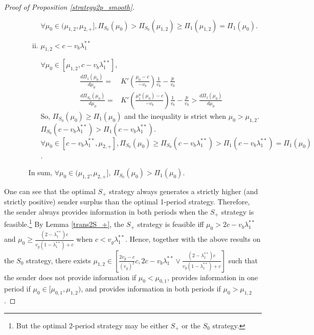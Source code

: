 \documentclass[11pt]{extarticle}
\newcommand{\M}{\vee}
\begin{document}
\begin{proof}[Proof of Proposition \ref{strategy2p_smooth}]
\begin{enumerate}
\begin{enumerate}
\begin{enumerate}[i)]
				$\forall \mu_0 \in (\mu_{1,2}, \mu_{2,+}], \Pi_{S_0}(\mu_0) > \Pi_{S_0}(\mu_{1,2}) \geq \Pi_1(\mu_{1,2}) = \Pi_1(\mu_0)$.
				
				\item $\mu_{1,2} < c - v_b\lambda_1^{**}$
				
				$\forall \mu_0 \in [\mu_{1,2}, c - v_b\lambda_1^{**}]$,
				\begin{align*}
				\frac{d \Pi_1(\mu_0)}{d \mu_0} =&K'(\frac{\mu_0-c}{-v_b})\frac{1}{v_b}-\frac{p}{v_b}\\
				\frac{d \Pi_{S_0}(\mu_0)}{d \mu_0} =&K'(\frac{\mu_1^u(\mu_0)-c}{-v_b})\frac{1}{v_b} - \frac{p}{v_b} > \frac{d \Pi_1(\mu_0)}{d \mu_0}
				\end{align*}
				So, $\Pi_{S_0}(\mu_0) \geq \Pi_1(\mu_0)$ and the inequality is strict when $\mu_0 > \mu_{1,2}$. $\Pi_{S_0}(c - v_b\lambda_1^{**}) > \Pi_1(c - v_b\lambda_1^{**})$. $\forall \mu_0 \in [c - v_b\lambda_1^{**}, \mu_{2,+}], \Pi_{S_0}(\mu_0) \geq \Pi_{S_0}(c - v_b\lambda_1^{**}) > \Pi_1(c - v_b\lambda_1^{**}) = \Pi_1(\mu_0)$.
			\end{enumerate}
			In sum, $\forall \mu_0 \in (\mu_{1,2}, \mu_{2,+}],~\Pi_{S_0}(\mu_0) > \Pi_1(\mu_0)$.
			
			
		\end{enumerate}
		
		
		
		
		
	\end{enumerate}
	
	One can see that the optimal $S_+$ strategy always generates a strictly higher (and strictly positive) sender surplus than the optimal 1-period strategy. Therefore, the sender always provides information in both periods when the $S_+$ strategy is feasible.\footnote{But the optimal 2-period strategy may be either $S_+$ or the $S_0$ strategy.} By Lemma \ref{trans2S_+}, the $S_+$ strategy is feasible iff $\mu_0 > 2c-v_b\lambda_1^{**}$ and $\mu_0 \geq \frac{(2-\lambda_1^{**})c}{v_g(1-\lambda_1^{**})+c}$ when $c < v_g\lambda_1^{**}$. Hence, together with the above results on the $S_0$ strategy, there exists $\mu_{1,2} \in [\frac{2v_g-c}{(v_g)^2}c, 2c-v_b\lambda_1^{**} \M \frac{(2-\lambda_1^{**})c}{v_g(1-\lambda_1^{**})+c}]$ such that the sender does not provide information if $\mu_0 < \mu_{0,1}$, provides information in one period if $\mu_0 \in [\mu_{0,1},\mu_{1,2})$, and provides information in both periods if $\mu_0 > \mu_{1,2}$.
\end{proof}
\end{document}
